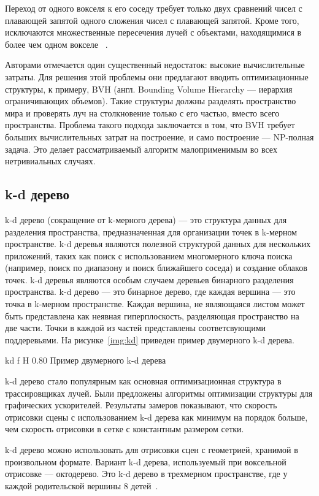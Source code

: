 Переход от одного вокселя к его соседу требует только двух сравнений чисел с плавающей запятой  
одного сложения чисел с плавающей запятой. Кроме того, исключаются множественные пересечения лучей с объектами, находящимися в более чем одном вокселе
~\cite{AFVTAfRT}.

Авторами отмечается один существенный недостаток: высокие вычислительные затраты. Для решения
этой проблемы они предлагают вводить оптимизационные структуры, к примеру, BVH 
(англ. Bounding Volume Hierarchy --- иерархия ограничивающих объемов). 
Такие структуры должны разделять пространство мира
и проверять луч на столкновение только с его частью, вместо всего пространства. Проблема такого 
подхода заключается в том, что BVH требует больших вычислительных затрат на построение, и
само построение --- NP-полная задача. Это делает рассматриваемый алгоритм малоприменимым во 
всех нетривиальных случаях.

\subsection{k-d дерево}

k-d дерево (сокращение от k-мерного дерева) --- это структура данных 
для разделения пространства, предназначенная для организации точек в 
k-мерном пространстве. k-d деревья являются полезной структурой данных 
для нескольких приложений, таких как поиск с использованием многомерного 
ключа поиска (например, поиск по диапазону и поиск ближайшего соседа) и 
создание облаков точек. k-d деревья являются особым случаем деревьев 
бинарного разделения пространства. k-d дерево --- это бинарное дерево, где каждая 
вершина --- это точка в k-мерном пространстве. Каждая вершина, не являющаяся листом 
может быть представлена как неявная гиперплоскость, разделяющая пространство на две части.
Точки в каждой из частей представлены соответсвующими поддеревьями. На рисунке~\ref{img:kd}
приведен пример двумерного k-d дерева.

    {kd}
    {f}
    {H}
    {0.80\textwidth}
    {Пример двумерного k-d дерева~\cite{KDtree}}

k-d дерево стало популярным как основная оптимизационная структура в 
трассировщиках лучей. Были предложены алгоритмы оптимизации структуры для графических
ускорителей. Результаты замеров показывают, что скорость отрисовки сцены с использованием
k-d дерева как минимум на порядок больше, чем скорость отрисовки в сетке с константным 
размером сетки.

k-d дерево можно использовать для отрисовки сцен с геометрией, хранимой в произвольном 
формате. Вариант k-d дерева, используемый при воксельной отрисовке --- октодерево. Это k-d дерево в трехмерном пространстве, где у каждой родительской вершины 8 детей~\cite{KDTASfaGR}.


